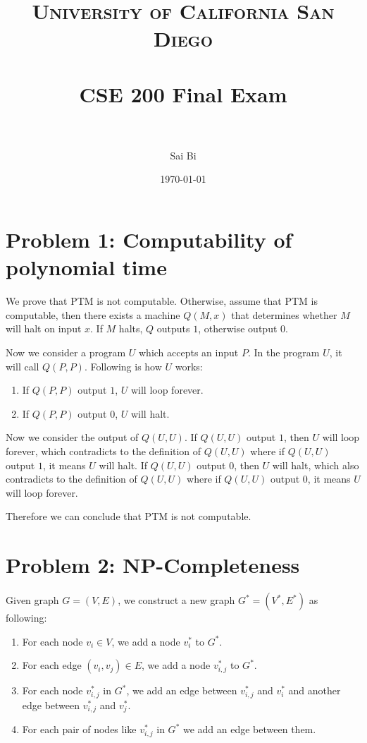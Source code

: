 \documentclass[paper=a4, fontsize=11pt]{scrartcl} %
\title{	
\normalfont \normalsize 
\textsc{University of California San Diego} \\ [25pt] %
\horrule{0.5pt} \\[0.4cm] %
\huge CSE 200 Final Exam\\ %
\horrule{2pt} \\[0.5cm] %
}
\author{Sai Bi} %
\date{\normalsize\today} %
\numberwithin{equation}{section} %
\numberwithin{figure}{section} %
\numberwithin{table}{section} %
\begin{document}
\maketitle %


\section*{Problem 1: Computability of polynomial time}

We prove that PTM is not computable. Otherwise, assume that PTM is computable, then there exists 
a machine $Q(M, x)$ that determines whether $M$ will halt on input $x$. If $M$ halts, $Q$ outputs
$1$, otherwise output $0$.

Now we consider a program $U$ which accepts an input $P$. In the program $U$, it will call $Q(P,
P)$. Following is how $U$ works:
\begin{enumerate}
  \item If $Q(P, P)$ output $1$, $U$ will loop forever.
  \item If $Q(P, P)$ output $0$, $U$ will halt. 
\end{enumerate}

Now we consider the output of $Q(U, U)$. If $Q(U, U)$ output $1$, then $U$ will loop forever, which
contradicts to the definition of $Q(U, U)$ where if $Q(U, U)$ output $1$, it means $U$ will
halt. If $Q(U, U)$ output $0$, then $U$ will halt, which also contradicts to the definition of 
$Q(U, U)$ where if $Q(U, U)$ output $0$, it means $U$ will loop forever.

Therefore we can conclude that PTM is not computable.



\section*{Problem 2: NP-Completeness}
Given graph $G = (V, E)$, we construct a new graph $G^* = (V^*, E^*)$ as following:
\begin{enumerate}
  \item For each node $v_i \in V$, we add a node $v_i^*$ to $G^*$.
  \item For each edge $(v_i, v_j) \in E$, we add a node $v^*_{i, j}$ to $G^*$.
  \item \label{item:1}
    For each node $v^*_{i, j}$ in $G^*$, we add an edge between $v_{i, j}^*$ and $v_i^*$ and
    another edge between $v_{i, j}^*$ and $v_j^*$.
  \item For each pair of nodes like $v_{i, j}^*$ in $G^*$ we add an edge between them. 
\end{enumerate}
\end{document}
